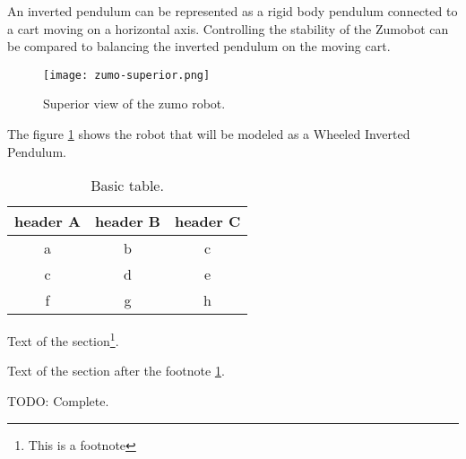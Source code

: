An inverted pendulum can be represented as a rigid body pendulum connected to a cart moving on a horizontal axis. Controlling the stability of the Zumobot can be compared to balancing the inverted pendulum on the moving cart.

\begin{figure}[h]
	\centering
	\texttt{[image: zumo-superior.png]}
	\caption{Superior view of the zumo robot.}
	\label{fig:sup-zumo}
\end{figure}

The figure \ref{fig:sup-zumo} shows the robot that will be modeled as a Wheeled Inverted Pendulum.

\begin{table}[h]
	\centering
	\caption{Basic table.}
	\label{tab:tab1}
	\begin{tabular}{ccc}
		\toprule
		header A & header B & header C\\
		\midrule
		a & b & c\\
		c & d & e\\
		f & g & h\\
		\bottomrule
	\end{tabular}
\end{table}

Text of the section\footnote{\label{fn1}This is a footnote}.

Text of the section after the footnote \ref{fn1}.

TODO: Complete.
